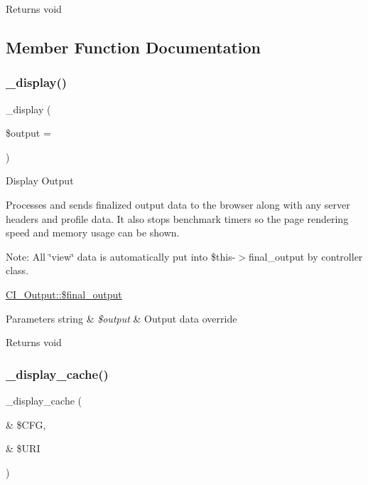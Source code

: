 \begin{DoxyReturn}{Returns}
void 
\end{DoxyReturn}


\subsection{Member Function Documentation}
\mbox{\label{class_c_i___output_acc6949872b39347a6314db4bc8c45c50}} 
\subsubsection{\texorpdfstring{\+\_\+display()}{\_display()}}
{\footnotesize\ttfamily \+\_\+display (\begin{DoxyParamCaption}\item[{}]{\$output = {\ttfamily \textquotesingle{}\textquotesingle{}} }\end{DoxyParamCaption})}

Display Output

Processes and sends finalized output data to the browser along with any server headers and profile data. It also stops benchmark timers so the page rendering speed and memory usage can be shown.

Note\+: All \char`\"{}view\char`\"{} data is automatically put into \$this-\/$>$final\+\_\+output by controller class.

\mbox{\hyperlink{class_c_i___output_aa1b5049c03b9ef373af010aa3cda17a3}{C\+I\+\_\+\+Output\+::\$final\+\_\+output}} 
\begin{DoxyParams}[1]{Parameters}
string & {\em \$output} & Output data override \\
\hline
\end{DoxyParams}
\begin{DoxyReturn}{Returns}
void 
\end{DoxyReturn}
\mbox{\label{class_c_i___output_acce78bdac02df9ab196a9c5939f6c4ab}} 
\subsubsection{\texorpdfstring{\+\_\+display\+\_\+cache()}{\_display\_cache()}}
{\footnotesize\ttfamily \+\_\+display\+\_\+cache (\begin{DoxyParamCaption}\item[{\&}]{\$\+C\+FG,  }\item[{\&}]{\$\+U\+RI }\end{DoxyParamCaption})}

